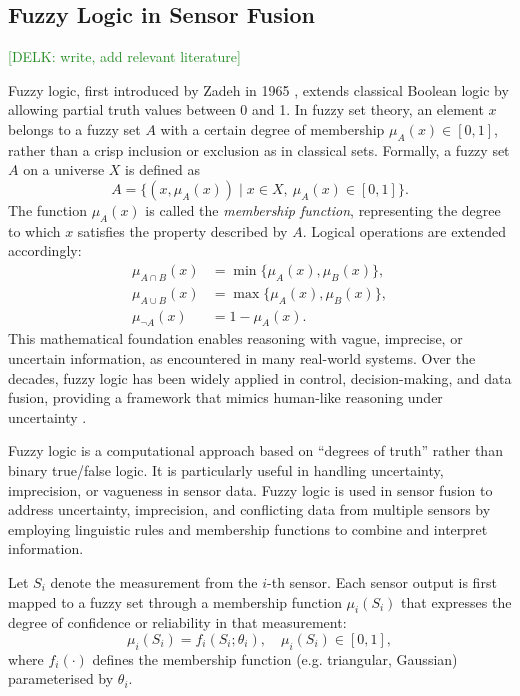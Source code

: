 \documentclass[journal]{IEEEtran}
\newcommand{\KD}[1]{\textcolor{ForestGreen}{{#1}}}
\begin{document}
\subsection{Fuzzy Logic in Sensor Fusion}
\KD{[DELK: write, add relevant literature]}

Fuzzy logic, first introduced by Zadeh in 1965 \cite{zadeh_fuzzy_1965}, extends classical Boolean logic by allowing partial truth values between 0 and 1. In fuzzy set theory, an element $x$ belongs to a fuzzy set $A$ with a certain degree of membership $\mu_A(x) \in [0,1]$, rather than a crisp inclusion or exclusion as in classical sets. Formally, a fuzzy set $A$ on a universe $X$ is defined as
\begin{equation}
A = \{(x, \mu_A(x)) \mid x \in X, \ \mu_A(x) \in [0,1]\}.
\end{equation}
The function $\mu_A(x)$ is called the \emph{membership function}, representing the degree to which $x$ satisfies the property described by $A$. Logical operations are extended accordingly:
\begin{align}
\mu_{A \cap B}(x) &= \min\{\mu_A(x), \mu_B(x)\}, \\
\mu_{A \cup B}(x) &= \max\{\mu_A(x), \mu_B(x)\}, \\
\mu_{\neg A}(x) &= 1 - \mu_A(x).
\end{align}
This mathematical foundation enables reasoning with vague, imprecise, or uncertain information, as encountered in many real-world systems. Over the decades, fuzzy logic has been widely applied in control, decision-making, and data fusion, providing a framework that mimics human-like reasoning under uncertainty \cite{klir_fuzzy_1995}.

Fuzzy logic is a computational approach based on ``degrees of truth'' rather than binary true/false logic. It is particularly useful in handling uncertainty, imprecision, or vagueness in sensor data. Fuzzy logic is used in sensor fusion to address uncertainty, imprecision, and conflicting data from multiple sensors by employing linguistic rules and membership functions to combine and interpret information. 

Let $S_i$ denote the measurement from the $i$-th sensor. Each sensor output is first mapped to a fuzzy set through a membership function $\mu_i(S_i)$ that expresses the degree of confidence or reliability in that measurement:
\begin{equation}
\mu_i(S_i) = f_i(S_i; \theta_i), \quad \mu_i(S_i) \in [0,1],
\end{equation}
where $f_i(\cdot)$ defines the membership function (e.g. triangular, Gaussian) parameterised by $\theta_i$.
\end{document}
